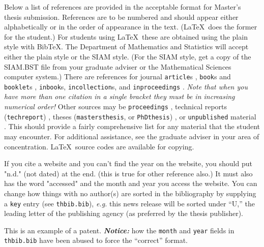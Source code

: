 Below a list of references are provided in the acceptable format for
Master's thesis submission. References are to be numbered and should
appear either alphabetically or in the order of appearance in the
text.  (\LaTeX\ does the former for the student.) For students using
\LaTeX\ these are obtained using the plain style with {\sc
Bib}\TeX. The Department of Mathematics and Statistics will accept
either the plain style or the SIAM style. (For the SIAM style, get a
copy of the SIAM.BST file from your graduate adviser or the
Mathematical Sciences computer system.) There are references for
journal \verb+article+s \cite{ART}, \verb+book+s and \verb+booklet+s
\cite{BOK,BKL}, \verb+inbook+s, \verb+incollection+s, and
\verb+inproceedings+
\cite{INC,INB,INP}. \emph{Note that when you have more than one citation in a single bracket
they must be in increasing numerical order!}  Other sources may be
\verb+proceedings+ \cite{PRO}, technical reports (\verb+techreport+)
\cite{TEC}, theses (\verb+mastersthesis+, or \verb+PhDthesis+)
\cite{MTH}, or \verb+unpublished+ material \cite{UNP}.  This should
provide a fairly comprehensive list for any material that the student
may encounter.  For additional assistance, see the graduate adviser in
your area of concentration. \LaTeX\ source codes are available for
copying.

If you cite a website \cite{Wikipedia} and you can't find the year on
the website, you should put "n.d." (not dated) at the end. (this is
true for other reference also.) It must also has the word "accessed"
and the month and year you access the website.  You can change how
things with no author(s) are sorted in the bibliography by supplying a
\verb+key+ entry (see \verb+thbib.bib+), \emph{e.g.} this news release
\cite{EPA-2010-09-07} will be sorted under ``U,'' the leading letter
of the publishing agency (as preferred by the thesis publisher).

This \cite{PatentExample} is an example of a patent.
\textbf{\textit{Notice:}} how the \texttt{month} and \texttt{year}
fields in \texttt{thbib.bib} have been abused to force the ``correct''
format.
